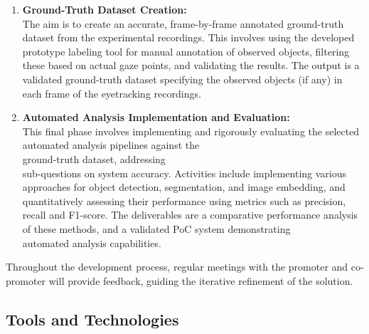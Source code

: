 \documentclass[english]{hogent-article}
\begin{document}
\begin{enumerate}
    \item \textbf{Ground-Truth Dataset Creation:}\\
    The aim is to create an accurate, frame-by-frame annotated ground-truth dataset from the experimental recordings. 
    This involves using the developed prototype labeling tool for manual annotation of observed objects, 
    filtering these based on actual gaze points, and validating the results.
    The output is a validated ground-truth dataset specifying the observed objects (if any) in each frame of the eyetracking recordings.
    \item \textbf{Automated Analysis Implementation and Evaluation:}\\
    This final phase involves implementing and rigorously evaluating the selected\\ automated analysis pipelines 
    against the\\ ground-truth dataset, addressing\\ sub-questions on system accuracy.
    Activities include implementing various\\ approaches for object detection, segmentation, and image embedding, and quantitatively 
    assessing their performance using metrics such as precision, recall and F1-score. 
    The deliverables are a comparative performance analysis of these methods, and a validated PoC system demonstrating\\ automated analysis capabilities.
\end{enumerate}

Throughout the development process, regular meetings with the promoter and co-promoter will provide feedback, guiding the iterative refinement of the solution.

\subsection{Tools and Technologies}
\end{document}
